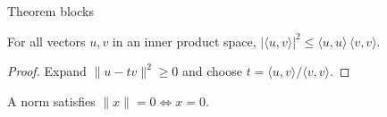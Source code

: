 \documentclass[aspectratio=169,10pt]{beamer}
\begin{document}
\begin{frame}{Theorem blocks}
	\begin{theorem}
		For all vectors $u, v$ in an inner product space, $|\langle u, v\rangle|^{2} \le \langle u, u\rangle\,\langle v, v\rangle$.
	\end{theorem}
	\begin{proof}
		Expand $\|u - tv\|^{2} \ge 0$ and choose $t = \langle u, v\rangle / \langle v, v\rangle$.
	\end{proof}
	\begin{definition}
		A \alert{norm} satisfies $\|x\| = 0 \iff x = 0$.
	\end{definition}
\end{frame}
\end{document}
